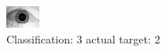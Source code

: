 \begin{figure}[h!]
\begin{center}
\includegraphics[width=0.60\columnwidth]{figures/ID1695_class_3_target_2.png}
\end{center}
\caption{ Classification: 3 actual target: 2}
\label{fig:ID1695_class_3_target_2}
\end{figure}
